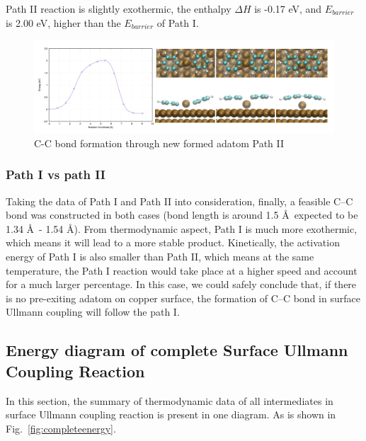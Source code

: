 \documentclass[%
 reprint,
 amsmath,amssymb,
 aps,
prb,
]{revtex4-2}
\begin{document}
Path II reaction is slightly exothermic, the enthalpy $\Delta H$ is -0.17 eV, and $E_{barrier}$ is 2.00 eV, higher than the $E_{barrier}$ of Path I.

\begin{figure}[hbt]
\centering
\includegraphics[width=1.0\textwidth]{Fig/bondformadatom.png}
\caption{C-C bond formation through new formed adatom Path II}
\label{fig:bondformadatom}
\end{figure}

\subsubsection{Path I vs path II}

Taking the data of Path I and Path II into consideration, finally, a feasible C--C bond was constructed in both cases (bond length is around 1.5 \AA\, expected to be 1.34 \AA\ - 1.54 \AA). From thermodynamic aspect, Path I is much more exothermic, which means it will lead to a more stable product. Kinetically, the activation energy of Path I is also smaller than Path II, which means at the same temperature, the Path I reaction would take place at a higher speed and account for a much larger percentage. In this case, we could safely conclude that, if there is no pre-exiting adatom on copper surface, the formation of C--C bond in surface Ullmann coupling will follow the path I.





\subsection{Energy diagram of complete Surface Ullmann Coupling Reaction}
In this section, the summary of thermodynamic data of all intermediates in surface Ullmann coupling reaction is present in one diagram. As is shown in Fig.~\ref{fig:completeenergy}.
\end{document}
